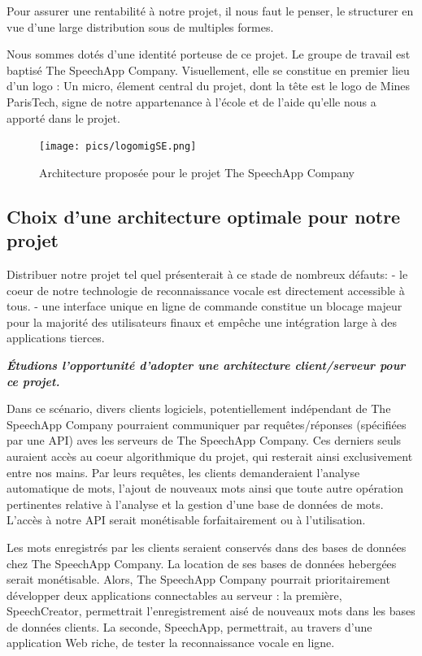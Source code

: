 \documentclass[a4paper,12pt]{report}
\begin{document}
Pour assurer une rentabilité à notre projet, il nous faut le penser, le structurer en vue d'une large distribution sous de multiples formes.

\medskip{}

Nous sommes dotés d'une identité porteuse de ce projet.
Le groupe de travail est baptisé The SpeechApp Company.
Visuellement, elle se constitue en premier lieu d'un logo : Un micro, élement central du projet, dont la tête est le logo de Mines ParisTech, signe de notre appartenance à l'école et de l'aide qu'elle nous a apporté dans le projet.

\begin{figure}[H]
	\begin{center}
	\texttt{[image: pics/logomigSE.png]} 
	\end{center}
	\caption{Architecture proposée pour le projet The SpeechApp Company}
\end{figure}

\subsection{Choix d'une architecture optimale pour notre projet}

Distribuer notre projet tel quel présenterait à ce stade de nombreux défauts:
- le coeur de notre technologie de reconnaissance vocale est directement accessible à tous.
- une interface unique en ligne de commande constitue un blocage majeur pour la majorité des utilisateurs finaux et empêche une intégration large à des applications tierces.

\bigskip

\textbf{\emph{Étudions l'opportunité d'adopter une architecture client/serveur pour ce projet.}}

\bigskip

Dans ce scénario, divers clients logiciels, potentiellement indépendant de The SpeechApp Company pourraient communiquer par requêtes/réponses (spécifiées par une API) aves les serveurs de The SpeechApp Company. Ces derniers seuls auraient accès au coeur algorithmique du projet, qui resterait ainsi exclusivement entre nos mains. Par leurs requêtes, les clients demanderaient l'analyse automatique de mots, l'ajout de nouveaux mots ainsi que toute autre opération pertinentes relative à l'analyse et la gestion d'une base de données de mots. L'accès à notre API serait monétisable forfaitairement ou à l'utilisation.

\medskip

Les mots enregistrés par les clients seraient conservés dans des bases de données chez The SpeechApp Company. La location de ses bases de données hebergées serait monétisable.
Alors, The SpeechApp Company pourrait prioritairement développer deux applications connectables au serveur : la première, SpeechCreator, permettrait l'enregistrement aisé de nouveaux mots dans les bases de données clients. La seconde, SpeechApp, permettrait, au travers d'une application Web riche, de tester la reconnaissance vocale en ligne.
\end{document}
